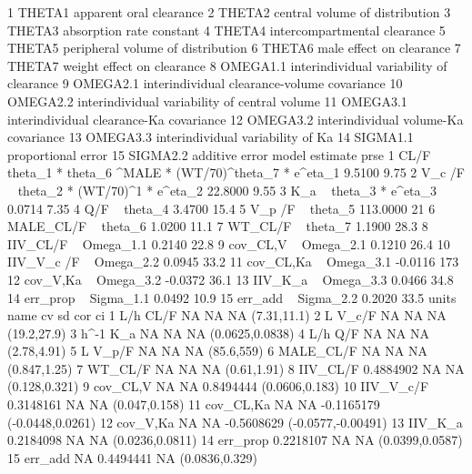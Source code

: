 \begin{Schunk}
\begin{Soutput}
1     THETA1                       apparent oral clearance
2     THETA2                central volume of distribution
3     THETA3                      absorption rate constant
4     THETA4                  intercompartmental clearance
5     THETA5             peripheral volume of distribution
6     THETA6                      male effect on clearance
7     THETA7                    weight effect on clearance
8   OMEGA1.1      interindividual variability of clearance
9   OMEGA2.1   interindividual clearance-volume covariance
10  OMEGA2.2 interindividual variability of central volume
11  OMEGA3.1       interindividual clearance-Ka covariance
12  OMEGA3.2          interindividual volume-Ka covariance
13  OMEGA3.3             interindividual variability of Ka
14  SIGMA1.1                            proportional error
15  SIGMA2.2                                additive error
                                                           model estimate prse
1  CL/F  ~ theta_1 *  theta_6 ^MALE * (WT/70)^theta_7  * e^eta_1   9.5100 9.75
2                        V_c /F  ~ theta_2 * (WT/70)^1 * e^eta_2  22.8000 9.55
3                                       K_a  ~ theta_3 * e^eta_3   0.0714 7.35
4                                                 Q/F  ~ theta_4   3.4700 15.4
5                                              V_p /F  ~ theta_5 113.0000   21
6                                            MALE_CL/F ~ theta_6   1.0200 11.1
7                                              WT_CL/F ~ theta_7   1.1900 28.3
8                                           IIV_CL/F ~ Omega_1.1   0.2140 22.8
9                                           cov_CL,V ~ Omega_2.1   0.1210 26.4
10                                        IIV_V_c /F ~ Omega_2.2   0.0945 33.2
11                                        cov_CL,Ka  ~ Omega_3.1  -0.0116  173
12                                         cov_V,Ka  ~ Omega_3.2  -0.0372 36.1
13                                          IIV_K_a  ~ Omega_3.3   0.0466 34.8
14                                          err_prop ~ Sigma_1.1   0.0492 10.9
15                                           err_add ~ Sigma_2.2   0.2020 33.5
   units      name        cv        sd        cor                 ci
1    L/h      CL/F        NA        NA         NA        (7.31,11.1)
2      L     V_c/F        NA        NA         NA        (19.2,27.9)
3  h^-1        K_a        NA        NA         NA    (0.0625,0.0838)
4    L/h       Q/F        NA        NA         NA        (2.78,4.91)
5      L     V_p/F        NA        NA         NA         (85.6,559)
6        MALE_CL/F        NA        NA         NA       (0.847,1.25)
7          WT_CL/F        NA        NA         NA        (0.61,1.91)
8         IIV_CL/F 0.4884902        NA         NA      (0.128,0.321)
9         cov_CL,V        NA        NA  0.8494444     (0.0606,0.183)
10       IIV_V_c/F 0.3148161        NA         NA      (0.047,0.158)
11       cov_CL,Ka        NA        NA -0.1165179   (-0.0448,0.0261)
12        cov_V,Ka        NA        NA -0.5608629 (-0.0577,-0.00491)
13         IIV_K_a 0.2184098        NA         NA    (0.0236,0.0811)
14        err_prop 0.2218107        NA         NA    (0.0399,0.0587)
15         err_add        NA 0.4494441         NA     (0.0836,0.329)
\end{Soutput}
\end{Schunk}
